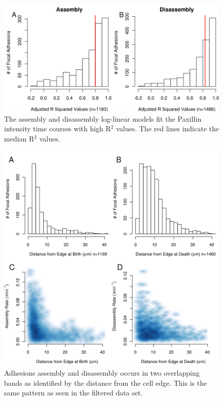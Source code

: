 \documentclass[letterpaper]{article}
\begin{document}
\begin{figure}[htbp]
\begin{center}
\includegraphics[width=\textwidth]{../figures/supplemental/R_squared}
\caption{The assembly and disassembly log-linear models fit the Paxillin
intensity time courses with high R$^2$ values. The red lines indicate the median
R$^2$ values.}
\label{default}
\end{center}
\end{figure}

\begin{figure}[htbp]
\begin{center}
\includegraphics[width=\textwidth]{../figures/supplemental/spacial_nofilt}
\caption{Adhesions assembly and disassembly occurs in two overlapping bands as
identified by the distance from the cell edge. This is the same pattern as
seen in the filtered data set.}
\label{default}
\end{center}
\end{figure}
\end{document}
